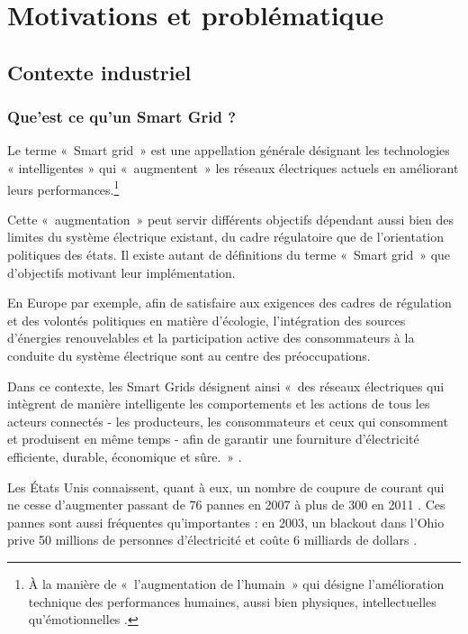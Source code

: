 \chapter{Motivations et problématique}
\label{chap:problematique}

\section{Contexte industriel}

\subsection{Que'est ce qu'un Smart Grid ?}
Le terme «~Smart grid~» est une appellation générale désignant les technologies 
« intelligentes » qui «~augmentent~» les réseaux électriques actuels en 
améliorant leurs performances.\footnote{À la manière de «~l'augmentation de 
l'humain~» qui désigne l'amélioration technique des performances humaines, aussi 
bien physiques, intellectuelles qu'émotionnelles \cite{le2013humain}.}

Cette «~augmentation~» peut servir différents objectifs dépendant aussi bien des 
limites du système électrique existant, du cadre régulatoire que de 
l'orientation politiques des états. Il existe autant de définitions du terme 
«~Smart grid~» que d'objectifs motivant leur implémentation.

En Europe par exemple, afin de satisfaire aux exigences des cadres de 
régulation et des volontés politiques en matière d'écologie, l'intégration des 
sources d’énergies renouvelables et la participation active des consommateurs 
à la conduite du système électrique sont au centre des préoccupations.

Dans ce contexte, les Smart Grids désignent ainsi «~des réseaux électriques qui 
intègrent de manière intelligente les comportements et les actions de tous les 
acteurs connectés - les producteurs, les consommateurs et ceux qui consomment 
et produisent en même temps - afin de garantir une fourniture d'électricité 
efficiente, durable, économique et sûre.~» \cite{ETP}.

Les États Unis connaissent, quant à eux, un nombre de coupure de courant qui ne 
cesse d'augmenter passant de 76 pannes en 2007 à plus de 300 en 2011 
\cite{detroit}. Ces pannes sont aussi fréquentes qu'importantes : en 2003, un 
blackout dans l'Ohio prive 50 millions de personnes d'électricité et coûte 6 
milliards de dollars \cite{andersson2005causes}.

